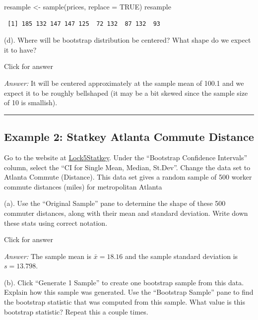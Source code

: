 \documentclass[
]{book}
\newenvironment{Shaded}{\begin{snugshade}}{\end{snugshade}}
\newcommand{\AttributeTok}[1]{\textcolor[rgb]{0.77,0.63,0.00}{#1}}
\newcommand{\ConstantTok}[1]{\textcolor[rgb]{0.00,0.00,0.00}{#1}}
\newcommand{\FunctionTok}[1]{\textcolor[rgb]{0.00,0.00,0.00}{#1}}
\newcommand{\NormalTok}[1]{#1}
\newcommand{\OtherTok}[1]{\textcolor[rgb]{0.56,0.35,0.01}{#1}}
\begin{document}
\begin{Shaded}
\begin{Highlighting}[]
\NormalTok{resample }\OtherTok{\textless{}{-}} \FunctionTok{sample}\NormalTok{(prices, }\AttributeTok{replace =} \ConstantTok{TRUE}\NormalTok{)}
\NormalTok{resample}
\end{Highlighting}
\end{Shaded}

\begin{verbatim}
 [1] 185 132 147 147 125  72 132  87 132  93
\end{verbatim}

(d). Where will be bootstrap distribution be centered? What shape do we expect it to have?

Click for answer

\emph{Answer:} It will be centered approximately at the sample mean of 100.1 and we expect it to be roughly bellshaped (it may be a bit skewed since the sample size of 10 is smallish).

\begin{center}\rule{0.5\linewidth}{0.5pt}\end{center}

\hypertarget{example-2-statkey-atlanta-commute-distance}{%
\subsection{Example 2: Statkey Atlanta Commute Distance}\label{example-2-statkey-atlanta-commute-distance}}

Go to the website at \href{http://www.lock5stat.com/StatKey/}{Lock5Statkey}. Under the ``Bootstrap Confidence Intervals'' column, select the ``CI for Single Mean, Median, St.Dev''. Change the data set to Atlanta Commute (Distance). This data set gives a random sample of 500 worker commute distances (miles) for metropolitan Atlanta

(a). Use the ``Original Sample'' pane to determine the shape of these 500 commuter distances, along with their mean and standard deviation. Write down these stats using correct notation.

Click for answer

\emph{Answer:} The sample mean is \(\bar{x} = 18.16\) and the sample standard deviation is \(s = 13.798\).

(b). Click ``Generate 1 Sample'' to create one bootstrap sample from this data. Explain how this sample was generated. Use the ``Bootstrap Sample'' pane to find the bootstrap statistic that was computed from this sample. What value is this bootstrap statistic? Repeat this a couple times.
\end{document}
